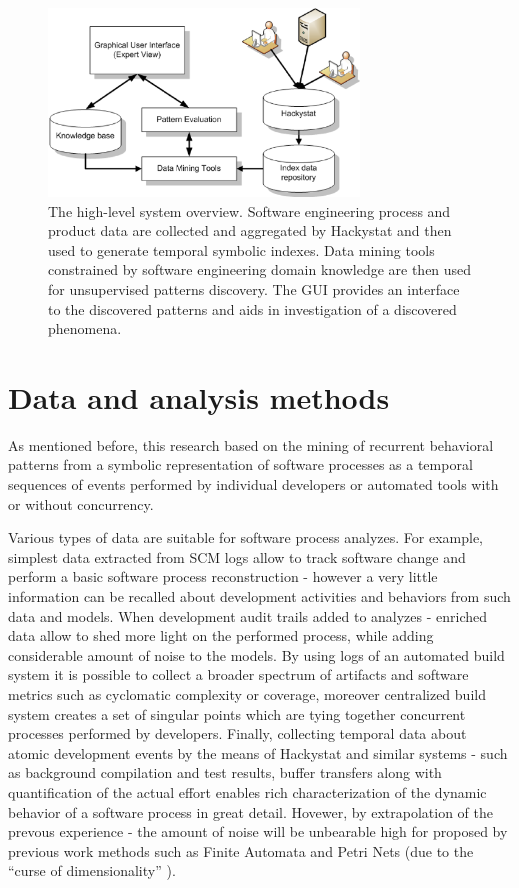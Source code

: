 \documentclass{sig-alternate}
\begin{document}
\begin{figure}[tbp]
   \centering
   \includegraphics[height=50mm]{system_overview.eps}
   \caption{The high-level system overview. Software engineering process and product data are collected and aggregated by Hackystat and then used to generate temporal symbolic indexes. Data mining tools constrained by software engineering domain knowledge are then used for unsupervised patterns discovery. The GUI provides an interface to the discovered patterns and aids in investigation of a discovered phenomena.}
   \label{fig:system_overview}
\end{figure}
 
\section{Data and analysis methods}
As mentioned before, this research based on the mining of recurrent behavioral patterns from a symbolic representation of software processes as a temporal sequences of events performed by individual developers or automated tools with or without concurrency. 

Various types of data are suitable for software process analyzes. For example, simplest data extracted from SCM logs allow to track software change and perform a basic software process reconstruction - however a very little information can be recalled about development activities and behaviors from such data and models. When development audit trails added to analyzes - enriched data allow to shed more light on the performed process, while adding considerable amount of noise to the models. By using logs of an automated build system it is possible to collect a broader spectrum of artifacts and software metrics such as cyclomatic complexity or coverage, moreover centralized build system creates a set of singular points which are tying together concurrent processes performed by developers. Finally, collecting temporal data about atomic development events by the means of Hackystat and similar systems - such as background compilation and test results, buffer transfers along with quantification of the actual effort enables rich characterization of the dynamic behavior of a software process in great detail. Hovewer, by extrapolation of the prevous experience - the amount of noise will be unbearable high for proposed by previous work methods such as Finite Automata and Petri Nets (due to the ``curse of dimensionality'' \cite{citeulike:4122657}). 
\end{document}
